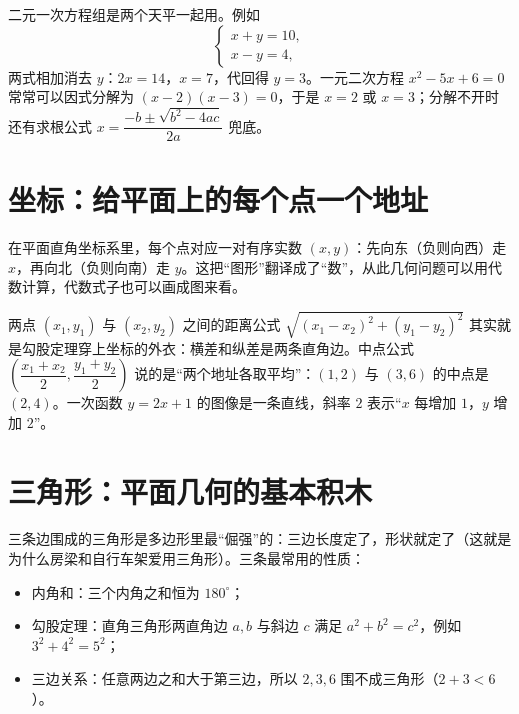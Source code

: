 二元一次方程组是两个天平一起用。例如
\[\begin{cases}x+y=10,\\ x-y=4,\end{cases}\]
两式相加消去 $y$：$2x=14$，$x=7$，代回得 $y=3$。一元二次方程 $x^2-5x+6=0$ 常常可以因式分解为 $(x-2)(x-3)=0$，于是 $x=2$ 或 $x=3$；分解不开时还有求根公式 $x=\dfrac{-b\pm\sqrt{b^2-4ac}}{2a}$ 兜底。

\section{坐标：给平面上的每个点一个地址}

在平面直角坐标系里，每个点对应一对有序实数 $(x,y)$：先向东（负则向西）走 $x$，再向北（负则向南）走 $y$。这把“图形”翻译成了“数”，从此几何问题可以用代数计算，代数式子也可以画成图来看。

\begin{center}
\end{center}

两点 $(x_1,y_1)$ 与 $(x_2,y_2)$ 之间的距离公式 $\sqrt{(x_1-x_2)^2+(y_1-y_2)^2}$ 其实就是勾股定理穿上坐标的外衣：横差和纵差是两条直角边。中点公式 $\left(\dfrac{x_1+x_2}{2},\dfrac{y_1+y_2}{2}\right)$ 说的是“两个地址各取平均”：$(1,2)$ 与 $(3,6)$ 的中点是 $(2,4)$。一次函数 $y=2x+1$ 的图像是一条直线，斜率 $2$ 表示“$x$ 每增加 $1$，$y$ 增加 $2$”。

\section{三角形：平面几何的基本积木}

三条边围成的三角形是多边形里最“倔强”的：三边长度定了，形状就定了（这就是为什么房梁和自行车架爱用三角形）。三条最常用的性质：

\begin{itemize}
\item 内角和：三个内角之和恒为 $180^\circ$；
\item 勾股定理：直角三角形两直角边 $a,b$ 与斜边 $c$ 满足 $a^2+b^2=c^2$，例如 $3^2+4^2=5^2$；
\item 三边关系：任意两边之和大于第三边，所以 $2,3,6$ 围不成三角形（$2+3<6$）。
\end{itemize}

